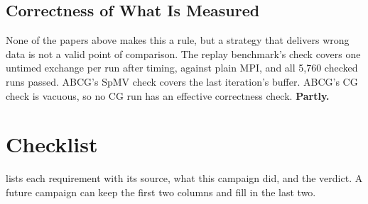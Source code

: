 \documentclass[11pt]{article}
\newcommand{\verdict}[1]{\textbf{#1}}
\begin{document}
\subsection{Correctness of What Is Measured}

None of the papers above makes this a rule, but a strategy that delivers wrong data is
not a valid point of comparison. The replay benchmark's check covers one untimed exchange
per run after timing, against plain MPI, and all 5,760 checked runs passed. ABCG's SpMV
check covers the last iteration's buffer. ABCG's CG check is vacuous, so no CG run has an
effective correctness check. \verdict{Partly.}

\section{Checklist}
\label{sec:checklist}

 lists each requirement with its source, what this campaign did, and
the verdict. A future campaign can keep the first two columns and fill in the last two.
\end{document}
